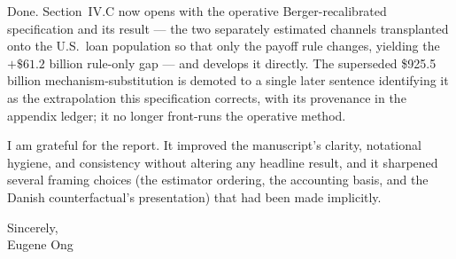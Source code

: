\documentclass[11pt]{article}
\begin{document}
Done. Section~IV.C now opens with the operative Berger-recalibrated
specification and its result --- the two separately estimated channels
transplanted onto the U.S.\ loan population so that only the payoff rule changes,
yielding the $+\$61.2$ billion rule-only gap --- and develops it directly. The
superseded \$925.5 billion mechanism-substitution is demoted to a single later
sentence identifying it as the extrapolation this specification corrects, with
its provenance in the appendix ledger; it no longer front-runs the operative
method.

\vspace{1em}

I am grateful for the report. It improved the manuscript's clarity, notational
hygiene, and consistency without altering any headline result, and it sharpened
several framing choices (the estimator ordering, the accounting basis, and the
Danish counterfactual's presentation) that had been made implicitly.

\vspace{1.5em}
\noindent Sincerely,\\
Eugene Ong
\end{document}
